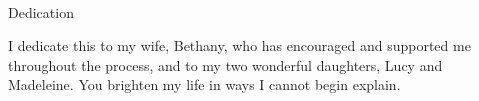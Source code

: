 

\renewcommand{\baselinestretch}{2}
\small\normalsize
\hbox{\ }

\vspace{-.65in}

\begin{center}
\large{Dedication}
\end{center}

\noindent I dedicate this to my wife, Bethany, who has encouraged and supported me throughout the process, and to my two wonderful daughters, Lucy and Madeleine. You brighten my life in ways I cannot begin explain.
